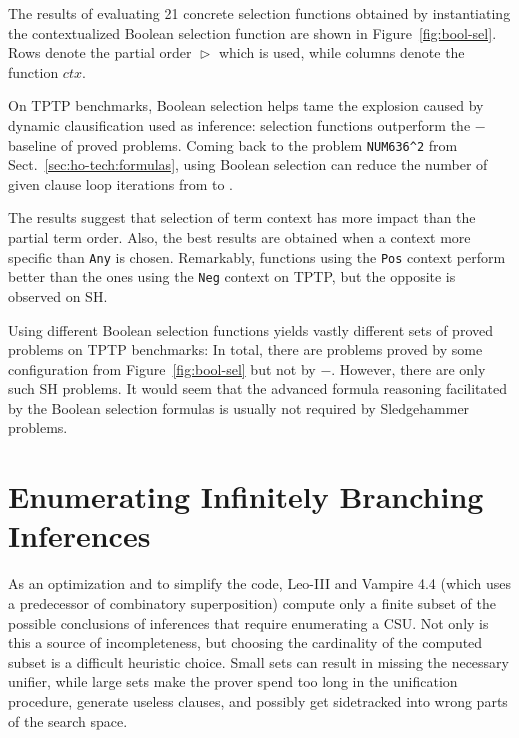 The results of evaluating 21 concrete selection functions obtained
by instantiating the contextualized Boolean selection function are shown in
Figure~\ref{fig:bool-sel}. Rows denote the partial order $\vartriangleright$ which is used,
while columns denote the function $\mathit{ctx}$.

On TPTP benchmarks, Boolean selection helps tame the explosion caused by
dynamic clausification used as inference:  selection functions
outperform the $-$ baseline of  proved problems. Coming back to the problem
\texttt{NUM636\^{}2} from Sect.~\ref{sec:ho-tech:formulas}, using Boolean selection
can reduce the number of given clause loop iterations from
 to .

The results suggest that selection of term context has more impact
than the partial term order. %
Also, the best results are obtained when a context more specific than \texttt{Any}
is chosen. Remarkably, functions using the \texttt{Pos} context
perform better than the ones using the \texttt{Neg} context
on TPTP, but the opposite is observed on SH.


Using different Boolean selection functions yields vastly different sets of
proved problems on TPTP benchmarks: In total, there are  problems
proved by some configuration from Figure~\ref{fig:bool-sel} but not by
$-$. However, there are only  such SH problems.
It would seem that the advanced formula reasoning facilitated by the Boolean
selection formulas is usually not required by Sledgehammer problems.


\section{Enumerating Infinitely Branching Inferences}
\label{sec:ho-tech:infinite-branching}

As an optimization and to simplify the code, Leo-III
\cite{as-18-phd} and Vampire 4.4 \cite{br-19-restricted-unif} (which uses
a predecessor of combinatory
superposition) compute only a finite subset of the possible conclusions of
inferences that require enumerating a CSU. Not only is this a source of
incompleteness, but choosing the cardinality of the computed subset is a
difficult heuristic choice. Small sets can result in missing the necessary unifier, while large sets make the prover spend too long in
the unification procedure, generate useless clauses, and possibly get sidetracked into wrong parts of the search space.

